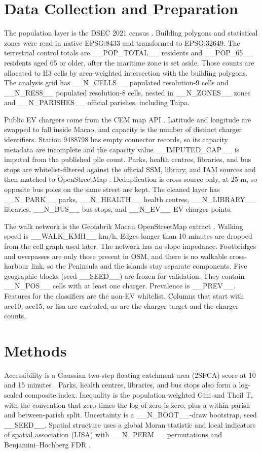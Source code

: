 \documentclass[11pt,a4paper]{article}
\begin{document}
\section{Data Collection and Preparation}
The population layer is the DSEC 2021 census \citep{dsec2021}. Building polygons and statistical zones were read in native EPSG:8433 and transformed to EPSG:32649. The terrestrial control totals are __POP_TOTAL__ residents and __POP_65__ residents aged 65 or older, after the maritime zone is set aside. Those counts are allocated to H3 cells by area-weighted intersection with the building polygons. The analysis grid has __N_CELLS__ populated resolution-9 cells and __N_RES8__ populated resolution-8 cells, nested in __N_ZONES__ zones and __N_PARISHES__ official parishes, including Taipa.

Public EV chargers come from the CEM map API \citep{cem2026}. Latitude and longitude are swapped to fall inside Macao, and capacity is the number of distinct charger identifiers. Station 9488798 has empty connector records, so its capacity metadata are incomplete and the capacity value __IMPUTED_CAP__ is imputed from the published pile count. Parks, health centres, libraries, and bus stops are whitelist-filtered against the official SSM, library, and IAM sources and then matched to OpenStreetMap \citep{osm2026}. Deduplication is cross-source only, at 25 m, so opposite bus poles on the same street are kept. The cleaned layer has __N_PARK__ parks, __N_HEALTH__ health centres, __N_LIBRARY__ libraries, __N_BUS__ bus stops, and __N_EV__ EV charger points.

The walk network is the Geofabrik Macau OpenStreetMap extract \citep{osm2026}. Walking speed is __WALK_KMH__ km/h. Edges longer than 10 minutes are dropped from the cell graph used later. The network has no slope impedance. Footbridges and overpasses are only those present in OSM, and there is no walkable cross-harbour link, so the Peninsula and the islands stay separate components. Five geographic blocks (seed __SEED__) are frozen for validation. They contain __N_POS__ cells with at least one charger. Prevalence is __PREV__. Features for the classifiers are the non-EV whitelist. Columns that start with acc10, acc15, or lisa are excluded, as are the charger target and the charger counts.

\section{Methods}
Accessibility is a Gaussian two-step floating catchment area (2SFCA) score at 10 and 15 minutes \citep{luo2003,dai2010}. Parks, health centres, libraries, and bus stops also form a log-scaled composite index. Inequality is the population-weighted Gini and Theil T, with the convention that zero times the log of zero is zero, plus a within-parish and between-parish split. Uncertainty is a __N_BOOT__-draw bootstrap, seed __SEED__. Spatial structure uses a global Moran statistic and local indicators of spatial association (LISA) with __N_PERM__ permutations and Benjamini--Hochberg FDR \citep{anselin1995,bh1995}.
\end{document}
